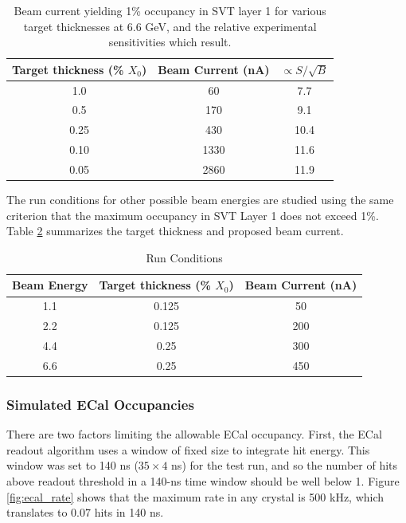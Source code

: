\begin{table}[h]
\begin{center}
\begin{tabular}{|c|c|c|} \hline
  Target thickness (\% $X_0$) & Beam Current (nA) & $\propto S/\sqrt{B}$ \\ \hline
  1.0 & 60 & 7.7 \\ \hline
  0.5 & 170 & 9.1 \\ \hline
  0.25 & 430 & 10.4 \\ \hline
  0.10 & 1330 & 11.6 \\ \hline
  0.05 & 2860 & 11.9 \\ \hline
\end{tabular}
\end{center}
\caption{\small{Beam current yielding 1\% occupancy in SVT layer 1 for various target 
thicknesses at 6.6 GeV, and the relative experimental sensitivities which result.}}
\label{tab:occup}
\end{table}

The run conditions for other possible beam energies are studied using the same criterion that the maximum occupancy 
in SVT Layer 1 does not exceed 1\%. Table \ref{tab:runc} summarizes the target thickness and proposed beam current. 

\begin{table}[h]
\begin{center}
\begin{tabular}{|c|c|c|} \hline
  Beam Energy & Target thickness (\% $X_0$) & Beam Current (nA) \\ \hline
  1.1 & 0.125 & 50 \\ \hline
  2.2 & 0.125 & 200 \\ \hline
  4.4 & 0.25  & 300 \\ \hline
  6.6 & 0.25 & 450 \\ \hline
\end{tabular}
\end{center}
\caption{\small{Run Conditions}}
\label{tab:runc}
\end{table}

\subsubsection{Simulated ECal Occupancies}

There are two factors limiting the allowable ECal occupancy. First, the ECal 
readout algorithm uses a window of fixed size to integrate hit energy. This 
window was set to 140 ns ($35 \times 4$ ns) for the test run, and so the 
number of hits above readout threshold in a 140-ns time window should be well 
below 1. Figure \ref{fig:ecal_rate} shows that the maximum rate in any crystal 
is 500 kHz, which translates to 0.07 hits in 140 ns.


